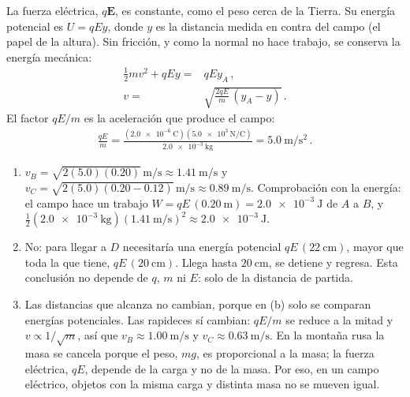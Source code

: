 \begin{solution}
La fuerza eléctrica, $q\boldsymbol{E}$, es constante, como el peso cerca de la Tierra. Su energía potencial es $U = qEy$, donde $y$ es la distancia medida en contra del campo (el papel de la altura). Sin fricción, y como la normal no hace trabajo, se conserva la energía mecánica:
\begin{align}
    \frac{1}{2}mv^2 + qEy =& qEy_A\,, \nonumber\\
    v =& \sqrt{\frac{2qE}{m}\,(y_A - y)}\,.
\end{align}
El factor $qE/m$ es la aceleración que produce el campo:
\begin{align}
    \frac{qE}{m} = \frac{(\qty{2.0e-6}{\coulomb})(\qty{5.0e3}{\N/\coulomb})}{\qty{2.0e-3}{\kg}} = \qty{5.0}{\m/\s^2}\,.
\end{align}
\begin{enumerate}
    \item $v_B=\sqrt{2(5.0)(0.20)}\,\unit{\m/\s}\approx\qty{1.41}{\m/\s}$ y $v_C=\sqrt{2(5.0)(0.20-0.12)}\,\unit{\m/\s}\approx\qty{0.89}{\m/\s}$. Comprobación con la energía: el campo hace un trabajo $W = qE\,(\qty{0.20}{\m}) = \qty{2.0e-3}{\joule}$ de $A$ a $B$, y $\tfrac{1}{2}(\qty{2.0e-3}{\kg})(\qty{1.41}{\m/\s})^2 \approx \qty{2.0e-3}{\joule}$.
    \item No: para llegar a $D$ necesitaría una energía potencial $qE\,(\qty{22}{\cm})$, mayor que toda la que tiene, $qE\,(\qty{20}{\cm})$. Llega hasta $\qty{20}{\cm}$, se detiene y regresa. Esta conclusión no depende de $q$, $m$ ni $E$: solo de la distancia de partida.
    \item Las distancias que alcanza no cambian, porque en (b) solo se comparan energías potenciales. Las rapideces sí cambian: $qE/m$ se reduce a la mitad y $v\propto 1/\sqrt{m}$, así que $v_B\approx\qty{1.00}{\m/\s}$ y $v_C\approx\qty{0.63}{\m/\s}$. En la montaña rusa la masa se cancela porque el peso, $mg$, es proporcional a la masa; la fuerza eléctrica, $qE$, depende de la carga y no de la masa. Por eso, en un campo eléctrico, objetos con la misma carga y distinta masa no se mueven igual.
\end{enumerate}
\end{solution}
